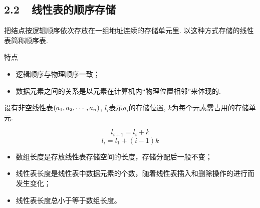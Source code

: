 \subsection{2.2~~线性表的顺序存储}
\begin{frame}\ft{\subsecname}
\begin{dingyi}
把结点按逻辑顺序依次存放在一组地址连续的存储单元里. 
以这种方式存储的线性表简称顺序表. 
\end{dingyi}

\pause 
\begin{block}{特点}
\begin{itemize}
\item
逻辑顺序与物理顺序一致；
\item
数据元素之间的关系是以元素在计算机内“物理位置相邻”来体现的. 
\end{itemize}
\end{block}
\end{frame}

\begin{frame}\ft{\subsecname}
  设有非空线性表$(a_1,a_2,\cdots,a_n)$,  $l_i$表示$a_i$的存储位置,  $k$为每个元素需占用的存储单元. 


$$
l_{i+1}=l_{i}+k
$$
$$
l_{i}=l_{1}+(i-1)k
$$
\end{frame}

\begin{frame}[fragile]\ft{\subsecname}


\end{frame}

\begin{frame}\ft{\subsecname}
  \begin{zhu}[数据长度与线性表长度的区别]
    \begin{itemize}
    \item 数组长度是存放线性表存储空间的长度，存储分配后一般不变； 
    \item 线性表长度是线性表中数据元素的个数，随着线性表插入和删除操作的进行而发生变化； 
    \item 线性表长度总小于等于数组长度。
    \end{itemize}
  \end{zhu}
\end{frame}

